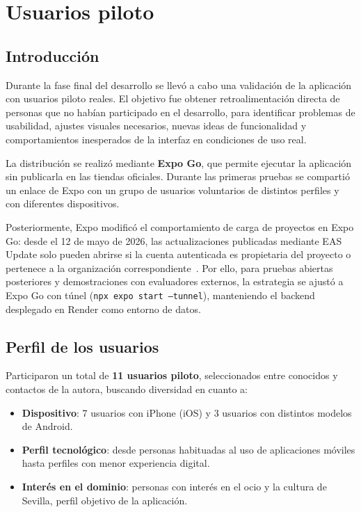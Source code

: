 \chapter{Usuarios piloto}\label{anexo:usuarios_piloto}

\section{Introducción}

Durante la fase final del desarrollo se llevó a cabo una validación de la aplicación con usuarios piloto reales. El objetivo fue obtener retroalimentación directa de personas que no habían participado en el desarrollo, para identificar problemas de usabilidad, ajustes visuales necesarios, nuevas ideas de funcionalidad y comportamientos inesperados de la interfaz en condiciones de uso real.

La distribución se realizó mediante \textbf{Expo Go}, que permite ejecutar la aplicación sin publicarla en las tiendas oficiales. Durante las primeras pruebas se compartió un enlace de Expo con un grupo de usuarios voluntarios de distintos perfiles y con diferentes dispositivos.

Posteriormente, Expo modificó el comportamiento de carga de proyectos en Expo Go: desde el 12 de mayo de 2026, las actualizaciones publicadas mediante EAS Update solo pueden abrirse si la cuenta autenticada es propietaria del proyecto o pertenece a la organización correspondiente~\cite{expoGoLoading2026}. Por ello, para pruebas abiertas posteriores y demostraciones con evaluadores externos, la estrategia se ajustó a Expo Go con túnel (\texttt{npx expo start --tunnel}), manteniendo el backend desplegado en Render como entorno de datos.

\section{Perfil de los usuarios}

Participaron un total de \textbf{11 usuarios piloto}, seleccionados entre conocidos y contactos de la autora, buscando diversidad en cuanto a:

\begin{itemize}
    \item \textbf{Dispositivo}: 7 usuarios con iPhone (iOS) y 3 usuarios con distintos modelos de Android.
    \item \textbf{Perfil tecnológico}: desde personas habituadas al uso de aplicaciones móviles hasta perfiles con menor experiencia digital.
    \item \textbf{Interés en el dominio}: personas con interés en el ocio y la cultura de Sevilla, perfil objetivo de la aplicación.
\end{itemize}

